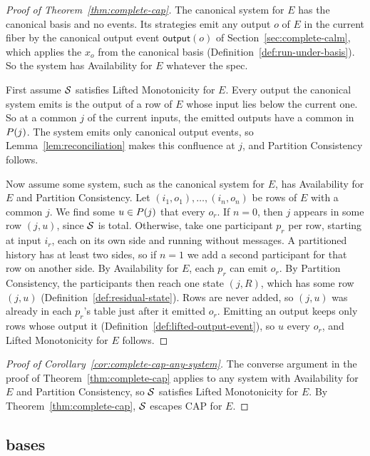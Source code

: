 \begin{proof}[Proof of Theorem~\ref{thm:complete-cap}]
The canonical system for $E$ has the canonical basis and no \commitment
events.  Its strategies emit any output $o$ of $E$ in the current fiber by
the canonical output event $\mathsf{output}(o)$ of
Section~\ref{sec:complete-calm}, which applies the \commitment $x_o$ from the
canonical basis (Definition~\ref{def:run-under-basis}).  So the system has
Availability for $E$ whatever the spec.

First assume $\mathcal{S}$ satisfies Lifted Monotonicity for $E$.  Every output the
canonical system emits is the output of a row of $E$ whose input lies below
the current one.  So at a common \indesc $j$ of the current inputs, the
emitted outputs have a common \outnoun in $P(j)$.  The system emits only
canonical output events, so Lemma~\ref{lem:reconciliation} makes this
confluence at $j$, and Partition Consistency follows.

Now assume some system, such as the canonical system for $E$, has
Availability for $E$ and Partition Consistency.  Let
$(i_1,o_1),\ldots,(i_n,o_n)$ be rows of $E$ with a common \indesc $j$.  We
find some $u\in P(j)$ that \outrel every $o_r$.  If $n=0$, then $j$
appears in some row $(j,u)$, since $\mathcal{S}$ is total.  Otherwise, take one
participant $p_r$ per row, starting at input $i_r$, each on its own side and
running without messages.  A partitioned history has at least two sides, so if
$n=1$ we add a second participant for that row on another side.  By
Availability for $E$, each $p_r$ can emit $o_r$.  By Partition Consistency,
the participants then reach one state $(j,R)$, which has some row $(j,u)$
(Definition~\ref{def:residual-state}).  Rows are never added, so $(j,u)$ was
already in each $p_r$'s table just after it emitted $o_r$.  Emitting an output
keeps only rows whose output \outrel it
(Definition~\ref{def:lifted-output-event}), so $u$ \outrel every $o_r$, and
Lifted Monotonicity for $E$ follows.
\end{proof}

\begin{proof}[Proof of Corollary~\ref{cor:complete-cap-any-system}]
The converse argument in the proof of Theorem~\ref{thm:complete-cap} applies
to any system with Availability for $E$ and Partition Consistency, so $\mathcal{S}$
satisfies Lifted Monotonicity for $E$.  By Theorem~\ref{thm:complete-cap},
$\mathcal{S}$ escapes CAP for $E$.
\end{proof}

\subsection{\Commitment bases}
\label{app:bases}\label{app:commitment-bases}


